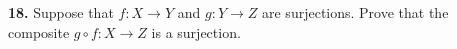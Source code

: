 \documentclass[paper=letter, fontsize=11pt]{scrartcl} %
\begin{document}
\textbf{18.} Suppose that $f: X \rightarrow Y$ and $g: Y \rightarrow Z$ are surjections. Prove that the
composite $g \circ f: X \rightarrow Z$ is a surjection.
\end{document}
